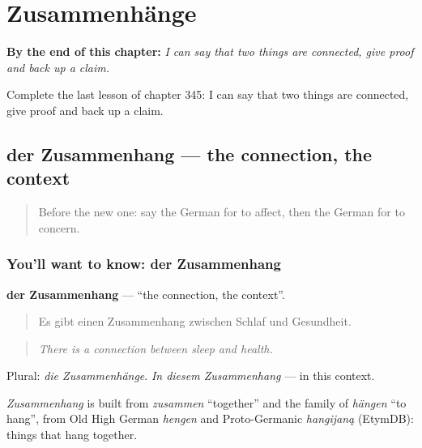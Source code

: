 
\chapter{Zusammenhänge}
\label{ch:ge-zusammenhange}

\begin{chapteropening}
\textbf{By the end of this chapter:} \emph{I can say that two things are connected, give proof and back up a claim.}

Complete the last lesson of chapter 345: I can say that two things are connected, give proof and back up a claim.
\end{chapteropening}

\section[der Zusammenhang]{der Zusammenhang — the connection, the context}

\label{lesson:GE-C345-zusammenhang}



\begin{quote}
Before the new one: say the German for to affect, then the German for to concern.
\end{quote}

\subsection*{You'll want to know: der Zusammenhang}
\textbf{der Zusammenhang} — \textquotedblleft{}the connection, the context\textquotedblright{}.

\begin{quote}
Es gibt einen Zusammenhang zwischen Schlaf und Gesundheit.
\end{quote}

\begin{quote}
\emph{There is a connection between sleep and health.}
\end{quote}

Plural: \emph{die Zusammenhänge}. \emph{In diesem Zusammenhang} — in this context.

\begin{cousinweb}
\emph{Zusammenhang} is built from \emph{zusammen} \textquotedblleft{}together\textquotedblright{} and the family of \emph{hängen} \textquotedblleft{}to hang\textquotedblright{}, from Old High German \emph{hengen} and Proto-Germanic \emph{hangijaną} (EtymDB): things that hang together.
\end{cousinweb}

